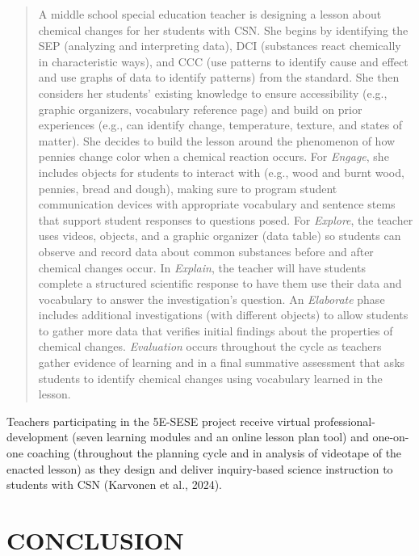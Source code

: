 \documentclass[11.5pt]{sig-alternate} %
\begin{document}
\begin{large}
\begin{quote}
A middle school special education teacher is designing a lesson about chemical changes for her students with CSN. She begins by identifying the SEP (analyzing and interpreting data), DCI (substances react chemically in characteristic ways), and CCC (use patterns to identify cause and effect and use graphs of data to identify patterns) from the standard. She then considers her students’ existing knowledge to ensure accessibility (e.g., graphic organizers, vocabulary reference page) and build on prior experiences (e.g., can identify change, temperature, texture, and states of matter). She decides to build the lesson around the phenomenon of how pennies change color when a chemical reaction occurs. For \textit{Engage}, she includes objects for students to interact with (e.g., wood and burnt wood, pennies, bread and dough), making sure to program student communication devices with appropriate vocabulary and sentence stems that support student responses to questions posed. For \textit{Explore}, the teacher uses videos, objects, and a graphic organizer (data table) so students can observe and record data about common substances before and after chemical changes occur. In \textit{Explain}, the teacher will have students complete a structured scientific response to have them use their data and vocabulary to answer the investigation’s question. An \textit{Elaborate} phase includes additional investigations (with different objects) to allow students to gather more data that verifies initial findings about the properties of chemical changes. \textit{Evaluation} occurs throughout the cycle as teachers gather evidence of learning and in a final summative assessment that asks students to identify chemical changes using vocabulary learned in the lesson.
\end{quote}

Teachers participating in the 5E-SESE project receive virtual professional-development (seven learning modules and an online lesson plan tool) and one-on-one coaching (throughout the planning cycle and in analysis of videotape of the enacted lesson) as they design and deliver inquiry-based science instruction to students with CSN (Karvonen et al., 2024).

\section*{CONCLUSION}


\end{large}
\end{document}
